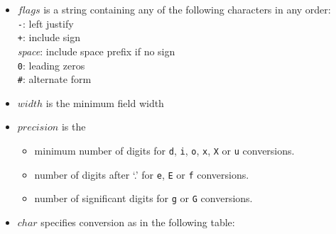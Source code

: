   \begin{itemize}
    \item 
    $flags$ is a string containing any of the following
    characters in any order:
    \\
    \texttt{-}: left justify
    \\
    \texttt{+}: include sign
    \\
    \emph{space}: include space prefix if no sign
    \\
    \texttt{0}: leading zeros
    \\
    \texttt{\#}: alternate form
    \item 
    $width$ is the minimum field width
    \item 
    $precision$ is the
    \begin{itemize}
      \item minimum number of digits for 
      \texttt{d}, 
      \texttt{i}, 
      \texttt{o}, 
      \texttt{x}, 
      \texttt{X} or 
      \texttt{u} conversions.
      \item number of digits after `.' for 
      \texttt{e}, 
      \texttt{E} or 
      \texttt{f} conversions.
      \item number of significant digits for 
      \texttt{g} or 
      \texttt{G} conversions.
    \end{itemize}
    \item 
    $char$ specifies conversion as in the following table:


\end{itemize}
